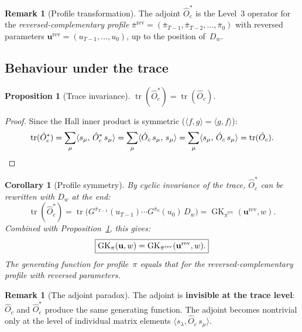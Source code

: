 \documentclass[11pt]{article}
\newcommand{\GK}{\operatorname{GK}}
\DeclareMathOperator{\tr}{tr}
\theoremstyle{plain}
\newtheorem{proposition}[theorem]{Proposition}
\newtheorem{corollary}[theorem]{Corollary}
\theoremstyle{definition}
\newtheorem{remark}[theorem]{Remark}
\begin{document}
\begin{remark}[Profile transformation]
\label{rem:profile-transform}
The adjoint $\hat{O}_c^*$ is the Level~3 operator for the
\emph{reversed-complementary profile}
$\bar\pi^{\mathrm{rev}} = (\bar\pi_{T-1}, \bar\pi_{T-2}, \ldots,
\bar\pi_0)$ with reversed parameters
$\mathbf{u}^{\mathrm{rev}} = (u_{T-1}, \ldots, u_0)$, up to the
position of~$D_w$.
\end{remark}


\subsection{Behaviour under the trace}

\begin{proposition}[Trace invariance]
\label{prop:trace-invariance}
$\tr(\hat{O}_c^*) = \tr(\hat{O}_c)$.
\end{proposition}

\begin{proof}
Since the Hall inner product is symmetric
($\langle f, g \rangle = \langle g, f \rangle$):
\[
  \tr(\hat{O}_c^*)
  = \sum_\mu \langle s_\mu,\, \hat{O}_c^*\, s_\mu \rangle
  = \sum_\mu \langle \hat{O}_c\, s_\mu,\, s_\mu \rangle
  = \sum_\mu \langle s_\mu,\, \hat{O}_c\, s_\mu \rangle
  = \tr(\hat{O}_c). \qedhere
\]
\end{proof}

\begin{corollary}[Profile symmetry]
\label{cor:profile-symmetry}
By cyclic invariance of the trace, $\hat{O}_c^*$ can be rewritten
with $D_w$ at the end:
\begin{equation}\label{eq:O-adj-cyclic}
  \tr(\hat{O}_c^*)
  = \tr\!\bigl(
    G^{\bar\pi_{T-1}}(u_{T-1}) \cdots G^{\bar\pi_0}(u_0)\, D_w
  \bigr)
  = \GK_{\bar\pi^{\mathrm{rev}}}(\mathbf{u}^{\mathrm{rev}}, w).
\end{equation}
Combined with Proposition~\ref{prop:trace-invariance}, this gives:
\begin{equation}\label{eq:GK-symmetry}
  \boxed{%
  \GK_\pi(\mathbf{u}, w)
  = \GK_{\bar\pi^{\mathrm{rev}}}(\mathbf{u}^{\mathrm{rev}}, w).}
\end{equation}
The generating function for profile~$\pi$ equals that for the
reversed-complementary profile with reversed parameters.
\end{corollary}

\begin{remark}[The adjoint paradox]
\label{rem:paradox}
The adjoint is \textbf{invisible at the trace level}: $\hat{O}_c$
and $\hat{O}_c^*$ produce the same generating function.  The
adjoint becomes nontrivial only at the level of individual matrix
elements $\langle s_\lambda, \hat{O}_c\, s_\mu \rangle$.
\end{remark}
\end{document}

